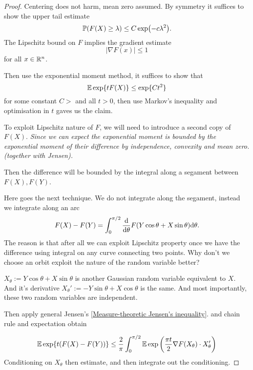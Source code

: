 \begin{proof}
    Centering does not harm, mean zero assumed. By symmetry it suffices to show the upper tail estimate
    \begin{equation*}
        \mathbb{P} (F(X)\geq \lambda) \leq C\exp (-c\lambda^2).
    \end{equation*}
    The Lipschitz bound on $F$ implies the gradient estimate 
    \begin{equation*}
        |\nabla  F(x)| \leq 1
    \end{equation*}
    for all $x\in \mathbb{R}^n$.

    Then use the exponential moment method, it suffices to show that
    \begin{equation*}
        \mathbb{E} \exp\{t F(X)\}\leq \exp\{Ct^2\}
    \end{equation*}
    for some constant $C>$ and all $t>0$, then use Markov's inequality and optimisation in $t$ gaves us the claim.

    To exploit Lipschitz nature of $F$, we will need to introduce a second copy of $F(X)$. \textit{Since we can expect the exponential moment is bounded by the exponential moment of their difference by independence, convexity and mean zero.(together with Jensen).}

    Then the difference will be bounded by the integral along a segament between $F(X),F(Y)$. 

    Here goes the next technique. We do not integrate along the segament, instead we integrate along an arc
    \begin{equation*}
        F(X)-F(Y) = \int_0^{\pi/2} \frac{\mathrm{d}}{\mathrm{d} \theta} F(Y\cos \theta +X\sin \theta)\mathrm{d} \theta.
    \end{equation*}
    The reason is that after all we can exploit Lipschitz property once we have the difference using integral on any curve connecting two points. 
    Why don't we choose an orbit exploit the nature of the random variable better? 

    $X_\theta := Y \cos \theta +X\sin \theta$ is another Gaussian random variable equivalent to $X$. And it's derivative $X_{\theta}' := -Y\sin \theta+X\cos \theta$ is the same. And most importantly, these two random variables are independent.

    Then apply general Jensen's \ref{Measure-theoretic Jensen's inequality}. and chain rule and expectation obtain

    \begin{equation*}
        \mathbb{E} \exp\{t(F(X)-F(Y))\}\leq \frac{2}{\pi} \int_0^{\pi/2}\mathbb{E} \exp \left(\frac{\pi t}{2} \nabla F(X_\theta)\cdot X_\theta'\right)
    \end{equation*}
    Conditioning on $X_\theta$ then estimate, and then integrate out the conditioning.
\end{proof}

